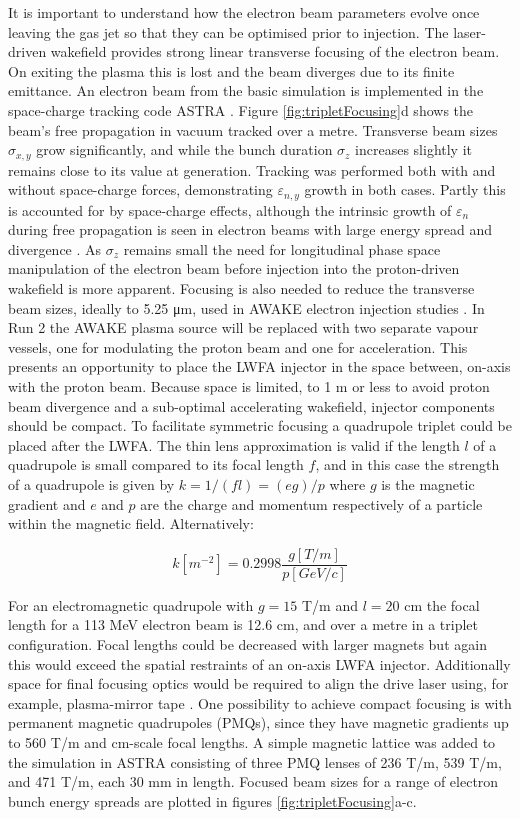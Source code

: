 \documentclass[preprint,5p,times,sort&compress]{elsarticle}
\begin{document}
It is important to understand how the electron beam parameters evolve once leaving the gas jet so that they can be optimised prior to injection. The laser-driven wakefield provides strong linear transverse focusing of the electron beam. On exiting the plasma this is lost and the beam diverges due to its finite emittance. An electron beam from the basic simulation is implemented in the space-charge tracking code ASTRA \cite{Floettmann2017}. Figure \ref{fig:tripletFocusing}d shows the beam's free propagation in vacuum tracked over a metre. Transverse beam sizes $\sigma_{x,y}$ grow significantly, and while the bunch duration $\sigma_z$ increases slightly it remains close to its value at generation. Tracking was performed both with and without space-charge forces, demonstrating $\varepsilon_{n,y}$ growth in both cases. Partly this is accounted for by space-charge effects, although the intrinsic growth of $\varepsilon_n$ during free propagation is seen in electron beams with large energy spread and divergence \cite{Migliorati2013}. As $\sigma_z$ remains small the need for longitudinal phase space manipulation of the electron beam before injection into the proton-driven wakefield is more apparent. Focusing is also needed to reduce the transverse beam sizes, ideally to 5.25 \si{\micro\meter}, used in AWAKE electron injection studies \cite{Olsen2018}. In Run 2 the AWAKE plasma source will be replaced with two separate vapour vessels, one for modulating the proton beam and one for acceleration. This presents an opportunity to place the LWFA injector in the space between, on-axis with the proton beam. Because space is limited, to 1 m or less to avoid proton beam divergence and a sub-optimal accelerating wakefield, injector components should be compact. To facilitate symmetric focusing a quadrupole triplet could be placed after the LWFA. The thin lens approximation is valid if the length $l$ of a quadrupole is small compared to its focal length $f$, and in this case the strength of a quadrupole is given by $k = 1/(fl) = (eg)/p$ where $g$ is the magnetic gradient and $e$ and $p$ are the charge and momentum respectively of a particle within the magnetic field. Alternatively:

\begin{equation}
k [m^{-2}] = 0.2998\frac{g [T/m]}{p [GeV/c]}
\end{equation}


For an electromagnetic quadrupole with $g = 15$ T/m and $l = 20 $ cm the focal length for a 113 MeV electron beam is 12.6 cm, and over a metre in a triplet configuration. Focal lengths could be decreased with larger magnets but again this would exceed the spatial restraints of an on-axis LWFA injector. Additionally space for final focusing optics would be required to align the drive laser using, for example, plasma-mirror tape \cite{Steinke2016}. One possibility to achieve compact focusing is with permanent magnetic quadrupoles (PMQs), since they have magnetic gradients up to 560 T/m \cite{Lim2005} and cm-scale focal lengths. A simple magnetic lattice was added to the simulation in ASTRA consisting of three PMQ lenses of 236 T/m, 539 T/m, and 471 T/m, each 30 mm in length. Focused beam sizes for a range of electron bunch energy spreads are plotted in figures \ref{fig:tripletFocusing}a-c.  
\end{document}
